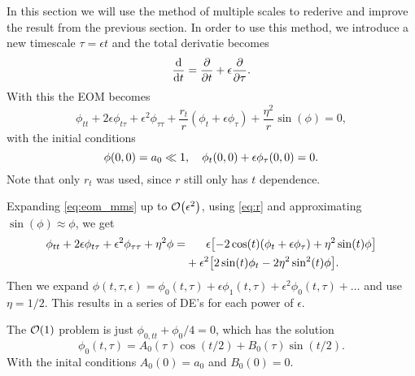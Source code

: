 \documentclass[11pt,letter, swedish, english,%
]{article}
\begin{document}
In this section we will use the method of multiple scales to
rederive and improve the result from the previous section. In order to
use this method, we introduce a new timescale $\tau=\epsilon{t}$ and
the total derivatie becomes
\begin{equation}
\dv{t}=\pdv{t}+\epsilon\pdv{\tau}.
\end{equation}
With this the EOM becomes
\begin{equation}\label{eq:eom_mms}
\phi_{tt}+2\epsilon\phi_{t\tau}+\epsilon^2\phi_{\tau\tau}
+\frac{r_t}{r}(\phi_t+\epsilon\phi_\tau)+\frac{\eta^2}{r}\sin(\phi)=0,
\end{equation}
with the initial conditions 
\begin{equation}\label{eq:inti_mms}
\phi(0, 0)=a_0\ll1\qcomma
\phi_t(0, 0)+\epsilon\phi_\tau(0, 0)=0.
\end{equation} 
Note that only $r_t$ was used, since $r$ still only has $t$
dependence. 

Expanding \eqref{eq:eom_mms} up to $\order{\epsilon^2}$, using
\eqref{eq:r} and approximating $\sin(\phi)\approx\phi$, we get
\begin{equation}
\begin{aligned}
\phi_{tt}+2\epsilon\phi_{t\tau}+\epsilon^2\phi_{\tau\tau}+\eta^2\phi
=&\hspace{18pt}
\epsilon\qty[-2\cos(t)(\phi_t+\epsilon\phi_\tau)+\eta^2\sin(t)\phi]\\
&+\epsilon^2\qty[2\sin(t)\phi_t-2\eta^2\sin^2(t)\phi].
\end{aligned}
\end{equation}
Then we expand 
$\phi(t,\tau,\epsilon)=\phi_0(t,\tau)+
\epsilon\phi_1(t,\tau)+\epsilon^2\phi_0(t,\tau)+\ldots$ and use
$\eta=1/2$. This results in a series of DE's for each power of
$\epsilon$. 

The $\order{1}$ problem is just $\phi_{0,tt}+\phi_0/4=0$, which has the
solution
\begin{equation}
\phi_0(t,\tau)=A_0(\tau)\cos(t/2)+B_0(\tau)\sin(t/2).
\end{equation}
With the inital conditions $A_0(0)=a_0$ and $B_0(0)=0$.
\end{document}
